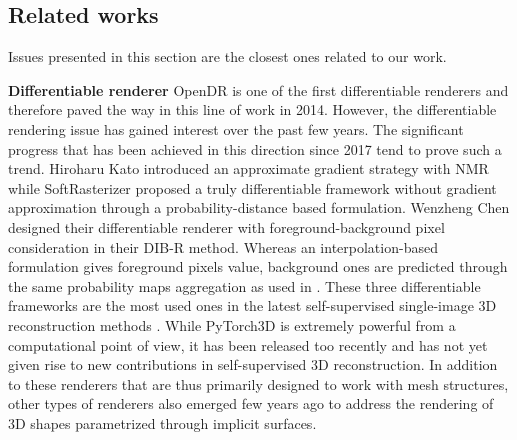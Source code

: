 \subsection{Related works}
\label{sec:related_works}

Issues presented in this section are the closest ones related to our work. \newline 

\noindent\textbf{Differentiable renderer} OpenDR \citep{loper2014opendr} is one of the first differentiable renderers and therefore paved the way in this line of work in 2014. However, the differentiable rendering issue has gained interest over the past few years. The significant progress that has been achieved in this direction since 2017 tend to prove such a trend. Hiroharu Kato \etal introduced an approximate gradient strategy with NMR\citep{kato2018neural} while SoftRasterizer\citep{liu1029soft} proposed a truly differentiable framework without gradient approximation through a probability-distance based formulation. Wenzheng Chen \etal designed their differentiable renderer with foreground-background pixel consideration in their DIB-R \citep{chen2019learning} method. Whereas an interpolation-based formulation gives foreground pixels value, background ones are predicted through the same probability maps aggregation as used in \citep{liu1029soft}. These three differentiable frameworks are the most used ones in the latest self-supervised single-image 3D reconstruction methods \citep{kanazawa2018learning,li2020self,pavllo2020convolutional}. While PyTorch3D \citep{ravi2020accelarating} is extremely powerful from a computational point of view, it has been released too recently and has not yet given rise to new contributions in self-supervised 3D reconstruction. In addition to these renderers that are thus primarily designed to work with mesh structures, other types of renderers\citep{niemeyer2020differentiable,jiang2020sdfdiff} also emerged few years ago to address the rendering of 3D shapes parametrized through implicit surfaces. 


